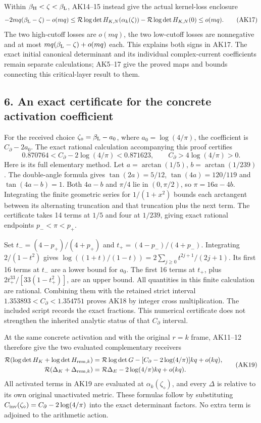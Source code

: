 \documentclass[11pt]{article}
\begin{document}
Within \(\beta_{\rm H}<\zeta<\beta_{\rm L}\), AK14--15 instead give the actual kernel-loss enclosure \[
-2mq(\beta_{\rm L}-\zeta)-o(mq)
\le
\mathcal R\log\det H_{K,N}(\alpha_k(\zeta))
-\mathcal R\log\det H_{K,N}(0)
\le o(mq).
\tag{AK17}
\] The two high-cutoff losses are \(o(mq)\), the two low-cutoff losses are nonnegative and at most \(mq(\beta_{\rm L}-\zeta)+o(mq)\) each. This explains both signs in AK17. The exact initial canonical determinant and its individual complex-current coefficients remain separate calculations; AK5--17 give the proved maps and bounds connecting this critical-layer result to them.

\subsection{6. An exact certificate for the concrete activation coefficient}\label{an-exact-certificate-for-the-concrete-activation-coefficient}

For the received choice \(\zeta_\diamond=\beta_{\rm L}-a_0\), where \(a_0=\log(4/\pi)\), the coefficient is \(C_\partial-2a_0\). The exact rational calculation accompanying this proof certifies \[
0.870764<C_\partial-2\log(4/\pi)<0.871623,
\qquad C_\partial>4\log(4/\pi)>0.
\tag{AK18}
\] Here is its full elementary method. Let \(a=\arctan(1/5)\), \(b=\arctan(1/239)\). The double-angle formula gives \(\tan(2a)=5/12\), \(\tan(4a)=120/119\) and \(\tan(4a-b)=1\). Both \(4a-b\) and \(\pi/4\) lie in \((0,\pi/2)\), so \(\pi=16a-4b\). Integrating the finite geometric series for \(1/(1+x^2)\) bounds each arctangent between its alternating truncation and that truncation plus the next term. The certificate takes 14 terms at \(1/5\) and four at \(1/239\), giving exact rational endpoints \(p_-<\pi<p_+\).

Set \(t_-=(4-p_+)/(4+p_+)\) and \(t_+=(4-p_-)/(4+p_-)\). Integrating \(2/(1-t^2)\) gives \(\log((1+t)/(1-t))=2\sum_{j\ge0}t^{2j+1}/(2j+1)\). Its first 16 terms at \(t_-\) are a lower bound for \(a_0\). The first 16 terms at \(t_+\), plus \(2t_+^{33}/[33(1-t_+^2)]\), are an upper bound. All quantities in this finite calculation are rational. Combining them with the retained strict interval \(1.353893<C_\partial<1.354751\) proves AK18 by integer cross multiplication. The included script records the exact fractions. This numerical certificate does not strengthen the inherited analytic status of that \(C_\partial\) interval.

At the same concrete activation and with the original \(r=k\) frame, AK11--12 therefore give the two evaluated complementary receivers \[
\begin{aligned}
\mathcal R(\log\det H_K+\log\det H_{{\rm rem},k})
 &=\mathcal R\log\det G-[C_\partial-2\log(4/\pi)]kq+o(kq),\\
\mathcal R(\Delta_K+\Delta_{{\rm rem},k})
 &=\mathcal R\Delta_E-2\log(4/\pi)kq+o(kq).
\end{aligned}\tag{AK19}
\] All activated terms in AK19 are evaluated at \(\alpha_k(\zeta_\diamond)\), and every \(\Delta\) is relative to its own original unactivated metric. These formulas follow by substituting \(C_{\rm inv}(\zeta_\diamond)=C_\partial-2\log(4/\pi)\) into the exact determinant factors. No extra term is adjoined to the arithmetic action.
\end{document}
